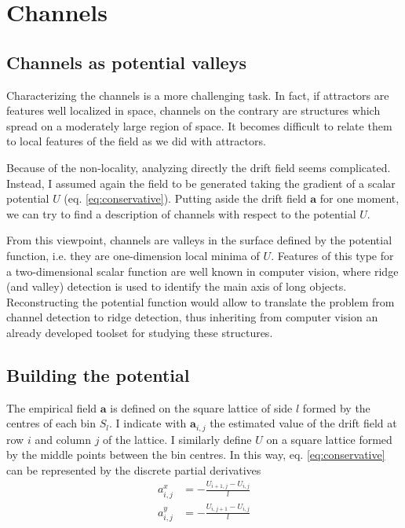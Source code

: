 \documentclass[a4paper]{article}
\begin{document}
\section{Channels}

\subsection{Channels as potential valleys}

Characterizing the channels is a more challenging task. In fact, if attractors are features well localized in space, channels on the contrary are structures which spread on a moderately large region of space. It becomes difficult to relate them to local features of the field as we did with attractors.

Because of the non-locality, analyzing directly the drift field seems complicated. Instead, I assumed again the field to be generated taking the gradient of a scalar potential $U$ (eq. \ref{eq:conservative}). Putting aside the drift field $\bm{a}$ for one moment, we can try to find a description of channels with respect to the potential $U$.

From this viewpoint, channels are valleys in the surface defined by the potential function, i.e. they are one-dimension local minima of $U$. Features of this type for a two-dimensional scalar function are well known in computer vision, where ridge (and valley) detection is used to identify the main axis of long objects. Reconstructing the potential function would allow to translate the problem from channel detection to ridge detection, thus inheriting from computer vision an already developed toolset for studying these structures.

\subsection{Building the potential}

The empirical field $\bm{a}$ is defined on the square lattice of side $l$ formed by the centres of each bin $S_l$. I indicate with $\bm{a}_{i,j}$ the estimated value of the drift field at row $i$ and column $j$ of the lattice. I similarly define $U$ on a square lattice formed by the middle points between the bin centres. In this way, eq. \ref{eq:conservative} can be represented by the discrete partial derivatives
\begin{align}
a^x_{i,j} &= - \frac{U_{i+1,j} - U_{i,j}}{l} \\[10pt]
a^y_{i,j} &= - \frac{U_{i,j+1} - U_{i,j}}{l}
\end{align}
\end{document}
